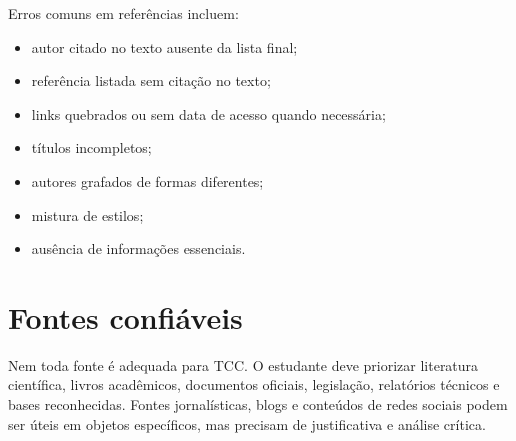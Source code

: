 Erros comuns em referências incluem:

\begin{itemize}
  \item autor citado no texto ausente da lista final;
  \item referência listada sem citação no texto;
  \item links quebrados ou sem data de acesso quando necessária;
  \item títulos incompletos;
  \item autores grafados de formas diferentes;
  \item mistura de estilos;
  \item ausência de informações essenciais.
\end{itemize}


\section{Fontes confiáveis}

Nem toda fonte é adequada para TCC. O estudante deve priorizar literatura científica, livros acadêmicos, documentos oficiais, legislação, relatórios técnicos e bases reconhecidas. Fontes jornalísticas, blogs e conteúdos de redes sociais podem ser úteis em objetos específicos, mas precisam de justificativa e análise crítica.
